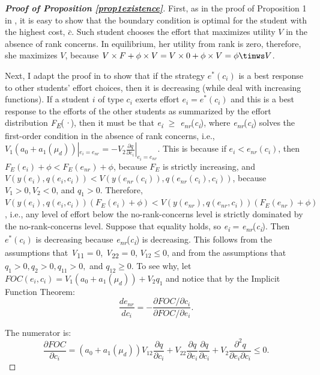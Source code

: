 \begin{proof}[{\bf Proof of Proposition \ref{prop1existence}}] 
First, as in the proof of Proposition 1 in \cite{hopkins2004running}, it is easy to show that the boundary condition
is optimal for the student with the highest cost, $\bar{c}$. Such student chooses the effort that maximizes utility $V$ in the absence of rank concerns. In equilibrium, her utility from rank is zero, therefore, she
maximizes $V$, because $V\times F+\phi\times V=V\times 0 + \phi\times V=\phi\timws V$.\par 

Next, I adapt the proof in \cite{hopkins2004running} to show that if the strategy $e^{*}(c_i)$ is a best response to other students’ effort choices, then it is
decreasing (while \cite{hopkins2004running} deal with increasing functions). If a student $i$ of type $c_i$ exerts effort $e_i=e^{*}(c_i)$ 
and this is a best response to the efforts of the other students as summarized
by the effort distribution \textit{F\textsubscript{E}}(\textit{·}), then it must be that \textit{e\textsubscript{i }$\geq$ e\textsubscript{nr}}(\textit{c\textsubscript{i}}), where \textit{e\textsubscript{nr}}(\textit{c\textsubscript{i}}) solves the first-order condition in the absence of
rank concerns, i.e., $V_1(a_0+a_1(\mu_d))|_{e_i=e_{nr}}=-V_2\frac{\partial q}{\partial e_i}|_{e_i=e_{nr}}$. This is
because if $e_i<e_{nr}(c_i)$, then $F_E(e_i)+\phi<F_E(e_{nr})+\phi$, because $F_E$ is strictly increasing, and $V\left(y(e_i),q(e_i,c_i)\right)<V\left(y(e_{nr}(c_i)),q(e_{nr}(c_i),c_i)\right)$, because $V_1>0, V_2<0$, and $q_1>0$.
Therefore, $V\left(y(e_i),q(e_i,c_i)\right)\left(F_E(e_i)+\phi\right)<V\left(y(e_{nr}),q(e_{nr},c_i)\right)\left(F_E(e_{nr})+\phi\right)$,
i.e., any level of effort below the no-rank-concerns level is strictly
dominated by the no-rank-concerns level. Suppose that equality holds, so \textit{e\textsubscript{i }}= \textit{e\textsubscript{nr}}(\textit{c\textsubscript{i}}).
Then $e^{*}(c_i)$ is decreasing because \textit{e\textsubscript{nr}}(\textit{c\textsubscript{i}}) is decreasing. This follows from the assumptions that \textit{V}\textsubscript{11 }= 0, \textit{V}\textsubscript{22 }= 0, $V_{12}\leq 0$, and from the assumptions that $q_1>0, q_2>0,q_{11}>0,$ and $q_{12}\geq 0$. To see why, let $FOC(e_i,c_i)=V_1(a_0+a_1(\mu_d))+V_2q_1$ and notice that by the Implicit Function Theorem:
$$\frac{d e_{nr}}{d c_i}=-\frac{\partial FOC/\partial c_i}{\partial FOC / \partial e_i}.$$

\noindent The numerator is:
$$\frac{\partial FOC}{\partial c_i}=(a_0+a_1(\mu_d))V_{12}\frac{\partial q}{\partial c_i}+V_{22}\frac{\partial q}{\partial e_i}\frac{\partial q}{\partial c_i}+V_2\frac{\partial^2 q}{\partial e_i \partial c_i}\leq 0.$$


\end{proof}
